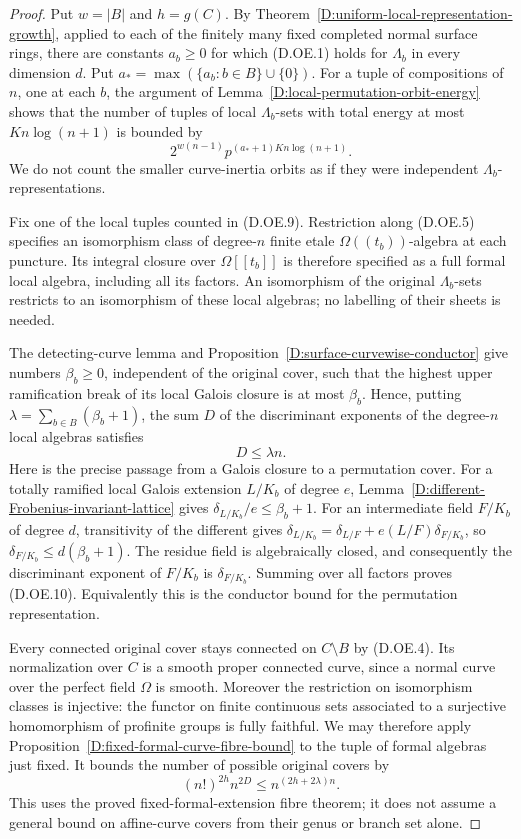 \begin{proof}
Put $w=|B|$ and $h=g(C)$.
By Theorem~\ref{D:uniform-local-representation-growth}, applied to
each of the finitely many fixed completed normal surface rings,
there are constants $a_b\ge0$ for which (D.OE.1) holds for
$\Lambda_b$ in every dimension $d$. Put
$a_*=\max(\{a_b:b\in B\}\cup\{0\})$.
For a tuple of compositions of $n$, one at each $b$, the argument of
Lemma~\ref{D:local-permutation-orbit-energy} shows that the number
of tuples of local $\Lambda_b$-sets with total energy at most
$K n\log(n+1)$ is bounded by
\[
             2^{w(n-1)}
                   p^{(a_*+1)K n\log(n+1)}.             \tag{D.OE.9}
\]
We do not count the smaller curve-inertia orbits as if they were
independent $\Lambda_b$-representations.

Fix one of the local tuples counted in (D.OE.9). Restriction along
(D.OE.5) specifies an isomorphism class of degree-$n$ finite etale
$\Omega((t_b))$-algebra at each puncture. Its integral closure over
$\Omega[[t_b]]$ is therefore specified as a full formal local
algebra, including all its factors. An isomorphism of the original
$\Lambda_b$-sets restricts to an isomorphism of these local algebras;
no labelling of their sheets is needed.

The detecting-curve lemma and
Proposition~\ref{D:surface-curvewise-conductor} give numbers
$\beta_b\ge0$, independent of the original cover, such that the
highest upper ramification break of its local Galois closure is
at most $\beta_b$. Hence, putting
$\lambda=\sum_{b\in B}(\beta_b+1)$, the sum $D$ of the discriminant
exponents of the degree-$n$ local algebras satisfies
\[
                               D\le\lambda n.             \tag{D.OE.10}
\]
Here is the precise passage from a Galois closure to a permutation
cover. For a totally ramified local Galois extension $L/K_b$ of
degree $e$, Lemma~\ref{D:different-Frobenius-invariant-lattice}
gives $\delta_{L/K_b}/e\le\beta_b+1$.
For an intermediate field $F/K_b$ of degree $d$, transitivity of
the different gives
$\delta_{L/K_b}=\delta_{L/F}+e(L/F)\delta_{F/K_b}$, so
$\delta_{F/K_b}\le d(\beta_b+1)$.
The residue field is algebraically closed, and consequently the
discriminant exponent of $F/K_b$ is $\delta_{F/K_b}$.
Summing over all factors proves (D.OE.10). Equivalently this is
the conductor bound for the permutation representation.

Every connected original cover stays connected on $C\setminus B$
by (D.OE.4). Its normalization over $C$ is a smooth proper connected
curve, since a normal curve over the perfect field $\Omega$ is
smooth. Moreover the restriction on isomorphism classes is
injective: the functor on finite continuous sets associated to a
surjective homomorphism of profinite groups is fully faithful.
We may therefore apply
Proposition~\ref{D:fixed-formal-curve-fibre-bound} to the tuple of
formal algebras just fixed. It bounds the number of possible
original covers by
\[
                             (n!)^{2h}n^{2D}
                             \le n^{(2h+2\lambda)n}.       \tag{D.OE.11}
\]
This uses the proved fixed-formal-extension fibre theorem; it does
not assume a general bound on affine-curve covers from their genus
or branch set alone.


\end{proof}
